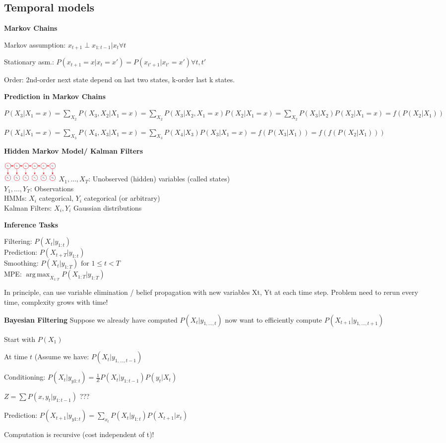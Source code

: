 \documentclass[a4paper, 11pt, landscape]{article}
\DeclareMathOperator*{\argmax}{arg\,max}
\begin{document}
\begin{multicols*}{3}
\subsection{Temporal models}

\textbf{Markov Chains}

Markov assumption: $x_{t+1} \perp x_{1:t-1} | x_t \forall t$

Stationary asm.: $P(x_{t+1} = x | x_t = x') = P(x_{t'+1} | x_{t'} = x') \forall t, t'$

Order: 2nd-order next state depend on last two states, k-order last k states. 

\textbf{Prediction in Markov Chains}

$P(X_3 | X_1 = x) = \sum_{X_2}P(X_3,X_2|X_1 = x) = \sum_{X_2}P(X_3 | X_2, X_1 = x)P(X_2 | X_1 = x) =  \sum_{X_2}P(X_3 | X_2)P(X_2 | X_1 = x) = f(P(X_2|X_1))$

$P(X_4 | X_1 = x) = \sum_{X_3}P(X_4,X_3|X_1 = x) = \sum_{X_3}P(X_4 | X_3)P(X_3 | X_1 = x) = f(P(X_3|X_1)) = f(f(P(X_2 | X_1)))$

\textbf{Hidden Markov Model/ Kalman Filters}

\includegraphics[height=1cm]{img/pai4.png}
$X_1,...,X_T$: Unobserved (hidden) variables (called states) \\
$Y_1,...,Y_T$: Observations \\
HMMs: $X_i$ categorical, $Y_i$ categorical (or arbitrary)\\
Kalman Filters: $X_i, Y_i$ Gaussian distributions

\textbf{Inference Tasks}

Filtering: $P(X_t | y_{1:t} ) $\\
Prediction: $P(X_{t+T} | y_{1:t} )$ \\
Smoothing: $P(X_t | y_{1:T}) \text{ for } 1\leq t < T$\\
MPE: $\argmax_{X_{1:T}} P(X_{1:T} | y_{1:T})$
 
In principle, can use variable elimination / belief propagation with new variables Xt, Yt at
each time step. Problem need to rerun every time, complexity grows with time!

\textbf{Bayesian Filtering}
Suppose we already have computed $P(X_t | y_{1,...,t})$ now want to efficiently compute $P(X_{t+1} | y_{1,...,t+1})$

\begin{compactitem}
	\item Start with $P(X_1)$
	\item At time $t$ (Assume we have:  $P(X_t | y_{1,...,t-1})$
	\item Conditioning: $P(X_t | y_{y1:t}) = \frac{1}{Z} P(X_t | y_{1:t-1})P(y_t | X_t)$
	\item $Z= \sum P(x,y_t | y_{1:t-1})$ ???
	\item Prediction: $P(X_{t+1} | y_{y1:t}) = \sum_{x_t}  P(X_t | y_{1:t}) P(X_{t+1} | x_t)$
\end{compactitem}
Computation is recursive (cost independent of t)!


\end{multicols*}
\end{document}
